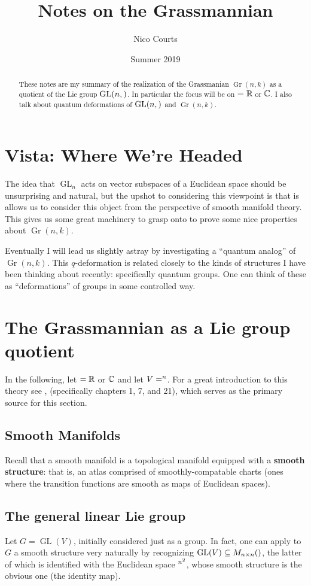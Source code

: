 \documentclass[12pt]{article}
\DeclareMathOperator{\Gr}{Gr}
\DeclareMathOperator{\GL}{GL}
\let\k\relax
\newcommand{\k}{\mathbbm{k}}
\begin{document}
\title{Notes on the Grassmannian \vspace{-1ex}}
\author{Nico Courts}
\date{Summer 2019}
\maketitle

\begin{abstract}
	These notes are my summary of the realization of the Grassmanian $\Gr(n,k)$ as a quotient of 
	the Lie group $\GL(n,\k)$. In particular the focus will be on $\k=\bbR$ or $\mathbb{C}$. I also talk about quantum 
	deformations of $\GL(n,\k)$ and $\Gr(n,k)$.
\end{abstract}

\section*{Vista: Where We're Headed}
The idea that $\GL_n$ acts on vector subspaces of a Euclidean space should be unsurprising and natural, but 
the upshot to considering this viewpoint is that is allows us to consider this object from the perspective of smooth 
manifold theory. This gives us some great machinery to grasp onto to prove some nice properties 
about $\Gr(n,k)$.

Eventually I will lead us slightly astray by investigating a ``quantum analog'' of $\Gr(n,k)$. This $q$-deformation
is related closely to the kinds of structures I have been thinking about recently: specifically quantum groups. One can think of 
these as ``deformations'' of groups in some controlled way.

\section{The Grassmannian as a Lie group quotient}
In the following, let $\k=\bbR$ or $\mathbb{C}$ and let $V=\k^n$. For a great introduction to this theory see \cite{LeeISM},
(specifically chapters 1, 7, and 21), which serves as the primary source for this section.
\subsection{Smooth Manifolds}
Recall that a smooth manifold is a topological manifold equipped with a \textbf{smooth structure}: that is, an atlas comprised 
of smoothly-compatable charts (ones where the transition functions are smooth as maps of Euclidean spaces).
\subsection{The general linear Lie group} 
Let $G=\GL(V)$, initially considered just as a group. In fact, one can apply to $G$ a smooth structure very naturally
by recognizing $\GL(V)\subseteq M_{n\times n}(\k)$, the latter of which is identified with the Euclidean space $\k^{n^2}$,
whose smooth structure is the obvious one (the identity map).
\end{document}
